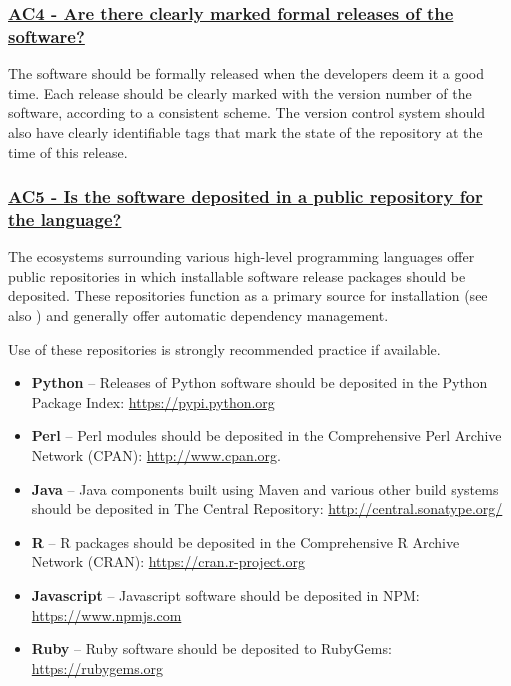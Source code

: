 \documentclass[a4paper,11pt]{article}
\newcommand{\criterion}[2]{\subsubsection*{\underline{#1 - #2}}\label{id:#1}}
\newcommand\CheckTable{%
  \begin{tabular}{ccccc}
    No & Minimal & Adequate & Good & Perfect \\
    0 & 1 & 2 & 3 & 4 \\
    \hline
    $\square$ & $\square$ & $\square$ & $\square$ & $\square$ \\
  \end{tabular}%
}
\newcommand{\refcrit}[1]{%
 \framebox[1.1\width]{\hyperref[id:#1]{#1}}
}
\begin{document}

\newcommand{\acFourID}{AC4}
\newcommand{\acFourText}{Are there clearly marked formal releases of the software?}
\criterion{\acFourID}{\acFourText}

The software should be formally released when the developers deem it a good
time. Each release should be clearly marked with the version number of the
software, according to a consistent scheme. The version control system should
also have clearly identifiable tags that mark the state of the repository at
the time of this release.


\newcommand{\acFiveID}{AC5}
\newcommand{\acFiveText}{Is the software deposited in a public repository for the language?}
\criterion{\acFiveID}{\acFiveText}

The ecosystems surrounding various high-level programming languages offer
public repositories in which installable software release packages should be
deposited. These repositories function as a primary source for installation (see also
\refcrit{IS3}) and generally offer automatic dependency management.

Use of these repositories is strongly recommended practice if available.

\begin{itemize}
    \item \textbf{Python} -- Releases of Python software should be deposited in
        the Python Package Index: \url{https://pypi.python.org}
    \item \textbf{Perl} --  Perl modules should be deposited in the Comprehensive
        Perl Archive Network (CPAN): \url{http://www.cpan.org}.
    \item \textbf{Java} -- Java components built using Maven and various other
        build systems should be deposited in The Central Repository: \url{http://central.sonatype.org/}
    \item \textbf{R} -- R packages should be deposited in the Comprehensive R
        Archive Network (CRAN): \url{https://cran.r-project.org}
    \item \textbf{Javascript} -- Javascript software should be deposited in
        NPM: \url{https://www.npmjs.com}
    \item \textbf{Ruby} -- Ruby software should be deposited to 
        RubyGems: \url{https://rubygems.org}
\end{itemize}

\end{document}
